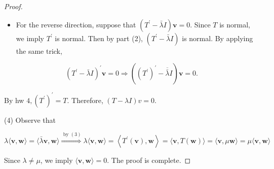 \documentclass[11pt]{article}
\begin{document}
\begin{proof}
\begin{itemize}
\item For the reverse direction, suppose that \(\left( {{T}^{\prime } - \bar{\lambda }I}\right) \mathbf{v} = 0\). Since \(T\) is normal, we imply \({T}^{\prime }\) is normal. Then by part (2), \(\left( {{T}^{\prime } - \bar{\lambda }I}\right)\) is normal. By applying the same trick,
\end{itemize}

\[
{\left( {T}^{\prime } - \bar{\lambda }I\right) }^{\prime }\mathbf{v} = 0 \Rightarrow  \left( {{\left( {T}^{\prime }\right) }^{\prime } - \overline{\bar{\lambda }}I}\right) \mathbf{v} = 0.
\]

By hw \(4,{\left( {T}^{\prime }\right) }^{\prime } = T\). Therefore, \(\left( {T - {\lambda I}}\right) v = 0\).

(4) Observe that

\[
\lambda \langle \mathbf{v},\mathbf{w}\rangle  = \langle \bar{\lambda }\mathbf{v},\mathbf{w}\rangle \overset{\text{ by }\left( 3\right) }{ \Rightarrow  }\lambda \langle \mathbf{v},\mathbf{w}\rangle  = \left\langle  {{T}^{\prime }\left( \mathbf{v}\right) ,\mathbf{w}}\right\rangle   = \langle \mathbf{v},T\left( \mathbf{w}\right) \rangle  = \langle \mathbf{v},\mu \mathbf{w}\rangle  = \mu \langle \mathbf{v},\mathbf{w}\rangle
\]

Since \(\lambda  \neq  \mu\), we imply \(\langle \mathbf{v},\mathbf{w}\rangle  = 0\). The proof is complete.
\end{proof}
\end{document}
